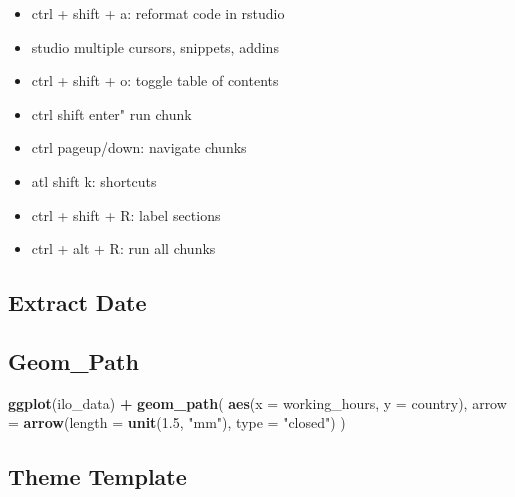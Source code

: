\documentclass[]{book}
\newenvironment{Shaded}{\begin{snugshade}}{\end{snugshade}}
\newcommand{\KeywordTok}[1]{\textcolor[rgb]{0.13,0.29,0.53}{\textbf{#1}}}
\newcommand{\DataTypeTok}[1]{\textcolor[rgb]{0.13,0.29,0.53}{#1}}
\newcommand{\FloatTok}[1]{\textcolor[rgb]{0.00,0.00,0.81}{#1}}
\newcommand{\StringTok}[1]{\textcolor[rgb]{0.31,0.60,0.02}{#1}}
\newcommand{\OperatorTok}[1]{\textcolor[rgb]{0.81,0.36,0.00}{\textbf{#1}}}
\newcommand{\NormalTok}[1]{#1}
\theoremstyle{definition}
\theoremstyle{definition}
\theoremstyle{definition}
\theoremstyle{remark}
\begin{document}
\begin{itemize}
\item
  ctrl + shift + a: reformat code in rstudio
\item
  studio multiple cursors, snippets, addins
\item
  ctrl + shift + o: toggle table of contents
\item
  ctrl shift enter" run chunk
\item
  ctrl pageup/down: navigate chunks
\item
  atl shift k: shortcuts
\item
  ctrl + shift + R: label sections
\item
  ctrl + alt + R: run all chunks
\end{itemize}

\subsection{Extract Date}\label{extract-date}

\begin{Shaded}
\end{Shaded}

\subsection{Geom\_Path}\label{geom_path}

\begin{Shaded}
\begin{Highlighting}[]
\KeywordTok{ggplot}\NormalTok{(ilo_data) }\OperatorTok{+}
\StringTok{  }\KeywordTok{geom_path}\NormalTok{(}
            \KeywordTok{aes}\NormalTok{(}\DataTypeTok{x =}\NormalTok{ working_hours, }\DataTypeTok{y =}\NormalTok{ country),}
            \DataTypeTok{arrow =} \KeywordTok{arrow}\NormalTok{(}\DataTypeTok{length =} \KeywordTok{unit}\NormalTok{(}\FloatTok{1.5}\NormalTok{, }\StringTok{"mm"}\NormalTok{), }\DataTypeTok{type =} \StringTok{"closed"}\NormalTok{)}
\NormalTok{)}
\end{Highlighting}
\end{Shaded}

\subsection{Theme Template}\label{theme-template}
\end{document}
